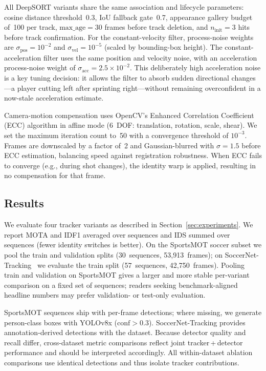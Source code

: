 All DeepSORT variants share the same association and lifecycle parameters:
cosine distance threshold~0.3, IoU fallback gate~0.7, appearance gallery
budget of~100 per track, $\text{max\_age} = 30$ frames before track
deletion, and $n_\text{init} = 3$ hits before track confirmation. For the
constant-velocity filter, process-noise weights are
$\sigma_\text{pos} = 10^{-2}$ and $\sigma_\text{vel} = 10^{-5}$ (scaled by
bounding-box height). The constant-acceleration filter uses the same
position and velocity noise, with an acceleration process-noise weight of
$\sigma_\text{acc} = 2.5 \times 10^{-2}$. This deliberately high
acceleration noise is a key tuning decision: it allows the filter to absorb
sudden directional changes---a player cutting left after sprinting
right---without remaining overconfident in a now-stale acceleration
estimate.

Camera-motion compensation uses OpenCV's Enhanced Correlation Coefficient
(ECC) algorithm in affine mode (6~DOF: translation, rotation, scale, shear).
We set the maximum iteration count to~50 with a convergence threshold of
$10^{-3}$. Frames are downscaled by a factor of~2 and Gaussian-blurred with
$\sigma = 1.5$ before ECC estimation, balancing speed against registration
robustness. When ECC fails to converge (e.g., during shot changes), the
identity warp is applied, resulting in no compensation for that frame.


\subsection{Results}
\label{sec:results}


We evaluate four tracker variants as described in
Section~\ref{sec:experiments}. We report MOTA and IDF1 averaged over
sequences and IDS summed over sequences (fewer identity switches is better).
On the SportsMOT soccer subset we pool the train and validation splits
(30~sequences, 53{,}913~frames); on
SoccerNet-Tracking~\cite{cioppa2022soccernettracking} we evaluate the train
split (57~sequences, 42{,}750~frames). Pooling train and validation on
SportsMOT gives a larger and more stable per-variant comparison on a fixed
set of sequences; readers seeking benchmark-aligned headline numbers may
prefer validation- or test-only evaluation.

SportsMOT sequences ship with per-frame detections; where missing, we
generate person-class boxes with YOLOv8x ($\mathrm{conf} > 0.3$).
SoccerNet-Tracking provides annotation-derived detections with the dataset.
Because detector quality and recall differ, cross-dataset metric comparisons
reflect joint tracker\,+\,detector performance and should be interpreted
accordingly. All within-dataset ablation comparisons use identical
detections and thus isolate tracker contributions.


